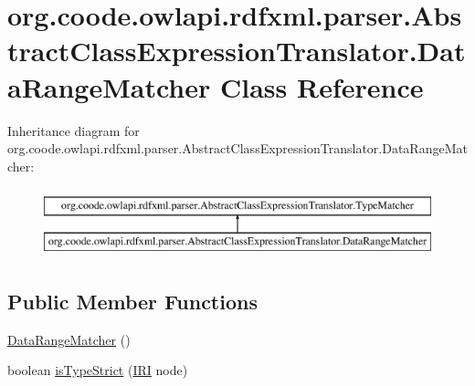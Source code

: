 \hypertarget{classorg_1_1coode_1_1owlapi_1_1rdfxml_1_1parser_1_1_abstract_class_expression_translator_1_1_data_range_matcher}{\section{org.\-coode.\-owlapi.\-rdfxml.\-parser.\-Abstract\-Class\-Expression\-Translator.\-Data\-Range\-Matcher Class Reference}
\label{classorg_1_1coode_1_1owlapi_1_1rdfxml_1_1parser_1_1_abstract_class_expression_translator_1_1_data_range_matcher}
}
Inheritance diagram for org.\-coode.\-owlapi.\-rdfxml.\-parser.\-Abstract\-Class\-Expression\-Translator.\-Data\-Range\-Matcher\-:\begin{figure}[H]
\begin{center}
\leavevmode
\includegraphics[height=2.000000cm]{classorg_1_1coode_1_1owlapi_1_1rdfxml_1_1parser_1_1_abstract_class_expression_translator_1_1_data_range_matcher}
\end{center}
\end{figure}
\subsection*{Public Member Functions}
\begin{DoxyCompactItemize}
\item 
\hyperlink{classorg_1_1coode_1_1owlapi_1_1rdfxml_1_1parser_1_1_abstract_class_expression_translator_1_1_data_range_matcher_a82d3c0d5bef5d34713bcb47b352b5a38}{Data\-Range\-Matcher} ()
\item 
boolean \hyperlink{classorg_1_1coode_1_1owlapi_1_1rdfxml_1_1parser_1_1_abstract_class_expression_translator_1_1_data_range_matcher_a4d9ec793ac3cc4c1044e068181d1b803}{is\-Type\-Strict} (\hyperlink{classorg_1_1semanticweb_1_1owlapi_1_1model_1_1_i_r_i}{I\-R\-I} node)
\end{DoxyCompactItemize}


